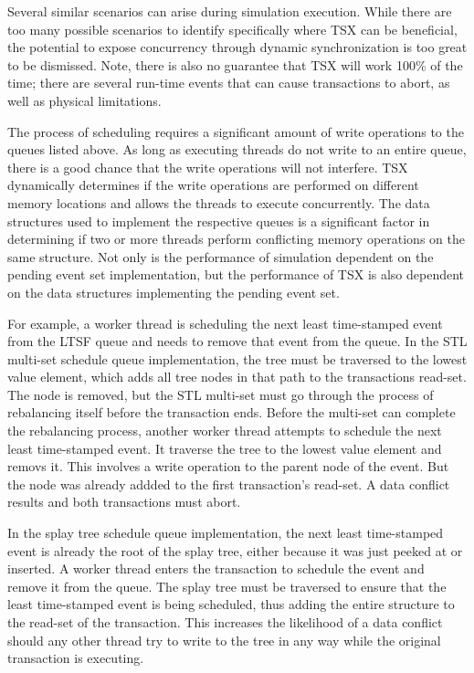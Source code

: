 \documentclass[11pt]{book}
\begin{document}
Several similar scenarios can arise during simulation execution.  While there are too many
possible scenarios to identify specifically where TSX can be beneficial, the potential to
expose concurrency through dynamic synchronization is too great to be dismissed.  Note,
there is also no guarantee that TSX will work 100\% of the time; there are several
run-time events that can cause transactions to abort, as well as physical limitations.

The process of scheduling requires a significant amount of write operations to the queues
listed above.  As long as executing threads do not write to an entire queue, there is a
good chance that the write operations will not interfere.  TSX dynamically determines if
the write operations are performed on different memory locations and allows the threads to
execute concurrently.  The data structures used to implement the respective queues is a
significant factor in determining if two or more threads perform conflicting memory
operations on the same structure.  Not only is the performance of simulation dependent on
the pending event set implementation, but the performance of TSX is also dependent on the
data structures implementing the pending event set.

For example, a worker thread is scheduling the next least time-stamped event from the LTSF
queue and needs to remove that event from the queue.  In the STL multi-set schedule queue
implementation, the tree must be traversed to the lowest value element, which adds all
tree nodes in that path to the transactions read-set.  The node is removed, but the STL
multi-set must go through the process of rebalancing itself before the transaction ends.
Before the multi-set can complete the rebalancing process, another worker thread attempts
to schedule the next least time-stamped event. It traverse the tree to the lowest value
element and removs it.  This involves a write operation to the parent node of the event.
But the node was already addded to the first transaction's read-set.  A data conflict
results and both transactions must abort.

In the splay tree schedule queue implementation, the next least time-stamped event is
already the root of the splay tree, either because it was just peeked at or inserted.  A
worker thread enters the transaction to schedule the event and remove it from the queue.
The splay tree must be traversed to ensure that the least time-stamped event is being
scheduled, thus adding the entire structure to the read-set of the transaction.  This
increases the likelihood of a data conflict should any other thread try to write to the
tree in any way while the original transaction is executing.
\end{document}

